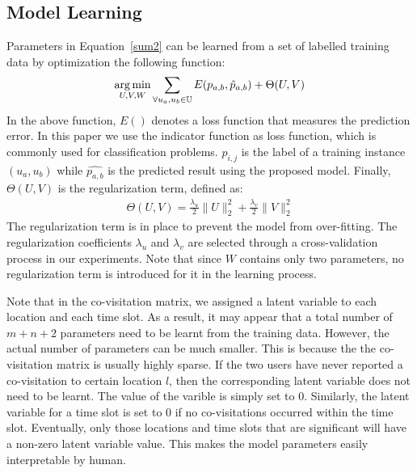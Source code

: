 \subsection{Model Learning}

Parameters in Equation~\ref{sum2} can be learned from a set of labelled training data by optimization the following function:
\begin{align}\label{opt}
\operatorname*{arg\,min}_{U, V, W} \sum_{ \forall u_a, u_b \in \mathbb{U} } E( p_{a,b}, \hat{p}_{a,b} ) + \Theta(U, V)
\end{align}
In the above function, $E()$ denotes a loss function that measures the prediction error. In this paper we use the indicator function as loss function, which is commonly used for classification problems. $p_{i,j}$ is the label of a training instance $(u_a, u_b)$ while $ \hat{p_{a,b}}$ is the predicted result using the proposed model. Finally, $\Theta(U, V)$ is the regularization term, defined as:
\begin{align}
\Theta(U, V) = \frac{\lambda_u}{2} \| U \|_2^2 + \frac{\lambda_v}{2} \| V \|_2^2
\end{align}
The regularization term is in place to prevent the model from over-fitting. The regularization coefficients $\lambda_u$ and $\lambda_v$ are selected through a cross-validation process in our experiments. Note that since $W$ contains only two parameters, no regularization term is introduced for it in the learning process.

Note that in the co-visitation matrix, we assigned a latent variable to each location and each time slot. As a result, it may appear that a total number of $m+n+2$ parameters need to be learnt from the training data. However, the actual number of parameters can be much smaller. This is because the the co-visitation matrix is usually highly sparse. If the two users have never reported a co-visitation to certain location $l$, then the corresponding latent variable does not need to be learnt. The value of the varible is simply set to 0. Similarly, the latent variable for a time slot is set to 0 if no co-visitations occurred within the time slot. Eventually, only those locations and time slots that are significant will have a non-zero latent variable value. This makes the model parameters easily interpretable by human.